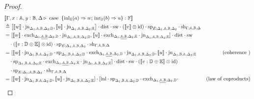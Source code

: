 \documentclass[10pt,a4paper]{amsart}
\theoremstyle{definition}
\theoremstyle{definition}
\theoremstyle{definition}
\theoremstyle{definition}
\theoremstyle{definition}
\theoremstyle{definition}
\begin{document}
\begin{proof}
\begin{align*}
  & [\![\Gamma,x:\typeA, y:\typeB, \Delta \vljud \text{ case }  \hspace{2pt}  \{\text{inl}_{\typeE} (a) \Rightarrow w ; \hspace{1pt} \text{inr}_{\typeD} (b) \Rightarrow u\}: \typeF]\!] \\
  & \triangleq    \left[[\![ w ]\!] \cdot  \text{jn}_{\Delta_{1},\typeA,\typeB,  \Delta_{2};\typeD},[\![ u ]\!] \cdot  \text{jn}_{\Delta_{1},\typeA,\typeB,  \Delta_{2};\typeE}\right]   \cdot \text{dist} \cdot \text{sw} \cdot ([\![v]\!] \otimes \text{id}) \cdot \text{sp}_{E; \Delta_{1},\typeA,\typeB,  \Delta_{2}} \cdot \text{sh}_{\Gamma;\typeA, \typeB,\Delta}  \\
  & = [[\![ w ]\!]  \cdot \text{exch}_{\Delta_{1},\underline{\typeA,\typeB},  \Delta_{2},\typeD} \cdot \text{jn}_{\Delta_{1},\typeA,\typeB,  \Delta_{2};\typeD},    [\![u ]\!] \cdot \text{exch}_{\Delta_{1},\underline{\typeA,\typeB},  \Delta_{2},\typeE} \cdot \text{jn}_{\Delta_{1},\typeA,\typeB,  \Delta_{2};\typeE} ] \cdot \text{dist} \cdot \text{sw} \\
  & \hspace{10pt} \cdot ([\![  v : \typeD \oplus \typeE  ]\!] \otimes \text{id}) \cdot\text{sp}_{E; \Delta_{1},\typeA,\typeB,  \Delta_{2}} \cdot \text{sh}_{\Gamma,\typeA, \typeB,\Delta} \\
  & = [[\![ w ]\!] \cdot \text{jn}_{\Delta_{1} ,\typeB,\typeA,  \Delta_{2};\typeD} \cdot \text{sp}_{\Delta_{1}, \typeB, \typeA, \Delta_{2};\typeD} \cdot  \text{exch}_{\Delta_{1},\underline{\typeA,\typeB},  \Delta_{2},\typeD} \cdot  \text{jn}_{\Delta_{1},\typeA,\typeB,  \Delta_{2};\typeD}  ,    [\![u ]\!] \cdot \text{jn}_{\Delta_{1} ,\typeB,\typeA,  \Delta_{2};\typeE} & {\text{(coherence )}} \\
  & \hspace{10pt} \cdot \text{sp}_{\Delta_{1}, \typeB, \typeA, \Delta_{2};\typeE} \cdot  \text{exch}_{\Delta_{1},\underline{\typeA,\typeB},  \Delta_{2},\typeE} \cdot  \text{jn}_{\Delta_{1},\typeA,\typeB,  \Delta_{2};\typeE} ] \cdot \text{dist} \cdot \text{sw} \cdot ([\![  v : \typeD \oplus \typeE  ]\!] \otimes \text{id}) \\
  & \hspace{10pt} \cdot\text{sp}_{E; \Delta_{1},\typeA,\typeB,  \Delta_{2}} \cdot \text{sh}_{\Gamma,\typeA, \typeB,\Delta} \\
  & = [[\![ w ]\!] \cdot \text{jn}_{\Delta_{1} ,\typeB,\typeA,  \Delta_{2};\typeD},  [\![u ]\!] \cdot \text{jn}_{\Delta_{1} ,\typeB,\typeA,  \Delta_{2};\typeE}] \cdot [\inl \cdot  \text{sp}_{\Delta_{1}, \typeB, \typeA, \Delta_{2};\typeD} \cdot  \text{exch}_{\Delta_{1},\underline{\typeA,\typeB},  \Delta_{2},\typeD} \cdot  & {\text{(law of coproducts)}} \\

\end{align*}
\end{proof}
\end{document}
